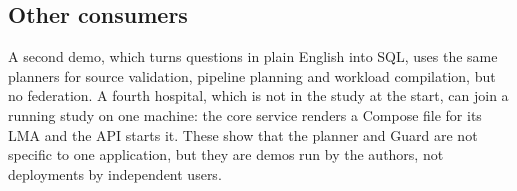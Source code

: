 \subsection{Other consumers}

A second demo, which turns questions in plain English into SQL, uses the same
planners for source validation, pipeline planning and workload compilation, but
no federation. A fourth hospital, which is not in the study at the start, can
join a running study on one machine: the core service renders a Compose file
for its LMA and the API starts it. These show that the planner and Guard are
not specific to one application, but they are demos run by the authors, not
deployments by independent users.
